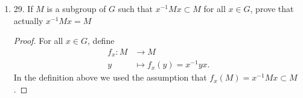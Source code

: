 \begin{enumerate}[resume]
\begin{proof}
Now we show that $Ha \subset Hb$, and $Hb \subset Ha$ will follow by symmetry. Take $y \in Ha$. By definition of $Ha$, there exists $h_{y} \in H$ such that $h_{y} a = y$. Because $H$ is a group, the $h_y h_1^{-1} h_1$ is an element of $H$ (by closure and existence of inverse) and equals $h_y$ (by associativity, identity and existence of inverse).
Now
\begin{align*}
	h_y a &= (h_y h_1^{-1}h_1) a \\
	&= h_y h_1^{-1} (h_1 a)  \\
	&= h_y h_1^{-1}(h_2 b) \\
	&= (h_y h_1^{-1} h_2) b
.\end{align*}
By group closure of $H$, the element $(h_y h_1^{-1} h_2) \in H$. Hence $y = h_y a \in Hb$.
\end{proof}

\item 29. If $M$ is a subgroup of $G$ such that $x^{-1} M x \subset M$ for all $x \in G$, prove that actually $x^{-1} M x=M$
\begin{proof}
	For all $x \in G$, define
	\begin{align*}
		f_x: M &\longrightarrow M \\
		y &\longmapsto f_x(y) = x^{-1} yx
	.\end{align*}
	In the definition above we used the assumption that $f_x(M) = x^{-1} Mx \subset M$.


\end{proof}
\end{enumerate}
